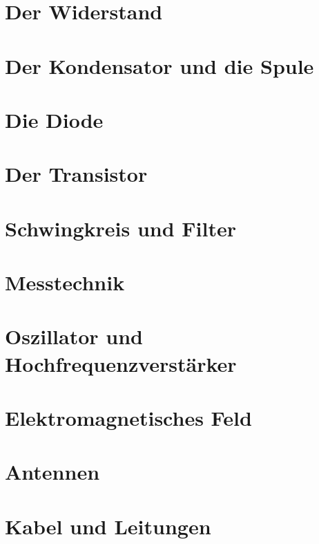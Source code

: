 \documentclass[ngerman,openany, oneside]{Script}
\begin{document}


\newpage

\chapter{Der Widerstand}


\chapter{Der Kondensator und die Spule}


\chapter{Die Diode}


\chapter{Der Transistor}


\chapter{Schwingkreis und Filter}


\chapter{Messtechnik}


\chapter{Oszillator und Hochfrequenzverstärker}


\chapter{Elektromagnetisches Feld}


\chapter{Antennen}


\chapter{Kabel und Leitungen}

\end{document}
